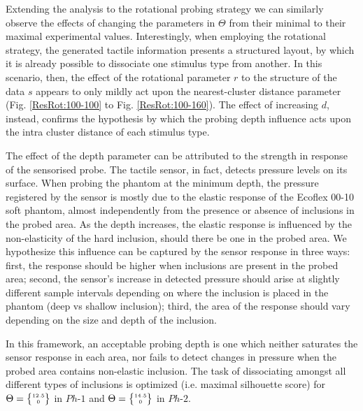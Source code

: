 Extending the analysis to the rotational probing strategy we can similarly observe the effects of 
changing the parameters in $\Theta$ from their minimal to their maximal experimental values. 
Interestingly, when employing the rotational strategy, the generated tactile information presents a 
structured layout, by which it is already possible to dissociate one stimulus type from another. In this 
scenario, then, the effect of the rotational parameter $r$ to the structure of the data $s$ appears to 
only mildly act upon the nearest-cluster distance parameter (Fig. \ref{ResRot:100-100} to 
Fig. \ref{ResRot:100-160}). The effect of increasing $d$, instead, confirms the hypothesis 
by which the probing depth influence acts upon the intra cluster distance of each stimulus type.  

The effect of the depth parameter can be attributed to the strength in response of the sensorised probe. 
The tactile sensor, in fact, detects pressure levels on its surface. When probing the phantom at the minimum 
depth, the pressure registered by the sensor is mostly due to the elastic response of the Ecoflex 00-10 soft 
phantom, almost independently from the presence or absence of inclusions in the probed area. As the depth 
increases, the elastic response is influenced by the non-elasticity of the hard inclusion, should there be 
one in the probed area. We hypothesize this influence can be captured by the sensor response in three ways: 
first, the response should be higher when inclusions are present in the probed area; second, the sensor's increase 
in detected pressure should arise at slightly different sample intervals depending on where the inclusion is placed 
in the phantom (deep vs shallow inclusion); third, the area of the response should vary depending on the 
size and depth of the inclusion. 

In this framework, an acceptable probing depth is one which neither saturates the sensor response in each area, 
nor fails to detect changes in pressure when the probed area contains non-elastic inclusion. The task of 
dissociating amongst all different types of inclusions is optimized (i.e. maximal silhouette score) for
$\Theta = \tiny{\begin{Bmatrix}12.5\\ 0\end{Bmatrix}}$ in $Ph\text{-}1$ and 
$\Theta = \tiny{\begin{Bmatrix}14.5\\ 0\end{Bmatrix}}$ in $Ph\text{-}2$.

